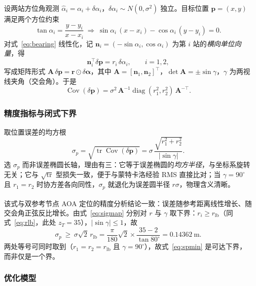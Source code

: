 \documentclass[UTF8,a4paper,zihao=-4,oneside]{ctexart}
\newcommand{\upcite}[1]{\textsuperscript{\cite{#1}}}
\begin{document}
设两站方位角观测 $\hat\alpha_i=\alpha_i+\delta\alpha_i$，$\delta\alpha_i\sim N(0,\sigma^2)$ 独立。目标位置 $\bm{p}=(x,y)$ 满足两个方位约束
\begin{equation}
\label{eq:bearing}
\tan\alpha_i=\frac{y-y_i}{x-x_i}
\ \Longrightarrow\
\sin\alpha_i\,(x-x_i)-\cos\alpha_i\,(y-y_i)=0 .
\end{equation}
对式~\eqref{eq:bearing} 线性化，记 $\bm{n}_i=(-\sin\alpha_i,\cos\alpha_i)$ 为第 $i$ 站的\emph{横向单位向量}，得
\begin{equation}
\label{eq:lin}
\bm{n}_i^{\top}\delta\bm{p}=r_i\,\delta\alpha_i,\qquad i=1,2,
\end{equation}
写成矩阵形式 $\bm{A}\,\delta\bm{p}=\bm{r}\odot\delta\bm{\alpha}$，其中 $\bm{A}=[\bm{n}_1,\bm{n}_2]^{\top}$，$\det\bm{A}=\pm\sin\gamma$，$\gamma$ 为两视线夹角（交会角）。于是
\begin{equation}
\label{eq:cov}
\operatorname{Cov}(\delta\bm{p})=\sigma^2\,\bm{A}^{-1}\operatorname{diag}(r_1^2,r_2^2)\,\bm{A}^{-\top}.
\end{equation}

\subsubsection{精度指标与闭式下界}

取位置误差的均方根
\begin{equation}
\label{eq:sigmap}
\sigma_p=\sqrt{\operatorname{tr}\operatorname{Cov}(\delta\bm{p})}
=\sigma\,\frac{\sqrt{r_1^2+r_2^2}}{|\sin\gamma|}.
\end{equation}
选 $\sigma_p$ 而非误差椭圆长轴，理由有三：它等于误差椭圆的\emph{均方半径}，与坐标系旋转无关；它与 $\sqrt{\operatorname{tr}}$ 型损失一致，便于与蒙特卡洛经验 RMS 直接比对；当 $\gamma=90^\circ$ 且 $r_1=r_2$ 时协方差各向同性，$\sigma_p$ 就退化为误差圆半径 $r\sigma$，物理含义清晰。

该式与双参考节点 AOA 定位的精度分析结论一致\upcite{he2015aoa}：误差随参考距离线性增长、随交会角正弦反比增长。由式~\eqref{eq:sigmap} 分别对 $r$ 与 $\gamma$ 取下界：$r_i\ge r_{\mathrm{lb}}$（同式~\eqref{eq:rlb}，此处 $z_T=35$），$|\sin\gamma|\le1$，故
\begin{equation}
\label{eq:spmin}
\sigma_p\ \ge\ \sigma\sqrt2\,r_{\mathrm{lb}}
=\frac{\pi}{180}\sqrt2\times\frac{35-2}{\tan80^\circ}=0.14362\ \mathrm{m}.
\end{equation}
两处等号可同时取到（$r_1=r_2=r_{\mathrm{lb}}$ 且 $\gamma=90^\circ$），故式~\eqref{eq:spmin} 是可达下界，而非仅是一个界。

\subsubsection{优化模型}
\end{document}
